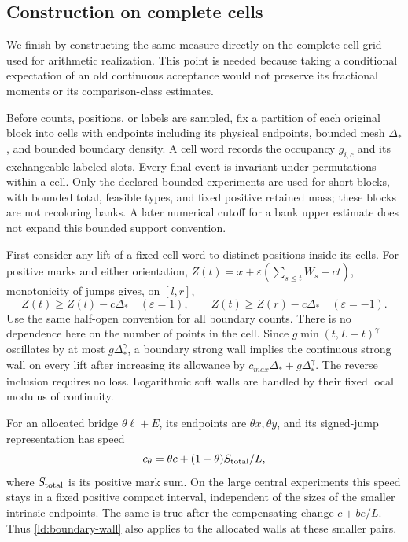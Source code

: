 \subsection{Construction on complete cells}
\label{ld:cells}

We finish by constructing the same measure directly on the complete
cell grid used for arithmetic realization.  This point is needed
because taking a conditional expectation of an old continuous
acceptance would not preserve its fractional moments or its
comparison-class estimates.

Before counts, positions, or labels are sampled, fix a partition of
each original block into cells with endpoints including its physical
endpoints, bounded mesh \(\Delta_*\), and bounded boundary density.
A cell word records the occupancy \(g_{i,c}\) and its exchangeable
labeled slots.  Every final event is invariant under permutations
within a cell.  Only the declared bounded experiments are used for
short blocks, with bounded total, feasible types, and fixed positive
retained mass; these blocks are not recoloring banks.  A later
numerical cutoff for a bank upper estimate does not expand this
bounded support convention.

First consider any lift of a fixed cell word to distinct positions
inside its cells.  For positive marks and either orientation,
\(Z(t)=x+\varepsilon(\sum_{s\le t}W_s-ct)\), monotonicity of
jumps gives, on \([l,r]\),
\begin{equation}
 Z(t)\ge Z(l)-c\Delta_*\quad(\varepsilon=1),\qquad
 Z(t)\ge Z(r)-c\Delta_*\quad(\varepsilon=-1).
 \label{ld:boundary-wall}
\end{equation}
Use the same half-open convention for all boundary counts.  There
is no dependence here on the number of points in the cell.  Since
\(g\min(t,L-t)^\gamma\) oscillates by at most
\(g\Delta_*^\gamma\), a boundary strong wall implies the
continuous strong wall on every lift after increasing its allowance
by \(c_{max}\Delta_*+g\Delta_*^\gamma\).  The reverse inclusion
requires no loss.  Logarithmic soft walls are handled by their fixed
local modulus of continuity.

For an allocated bridge \(\theta\ell+E\), its endpoints are
\(\theta x,\theta y\), and its signed-jump representation has speed
\begin{equation}
 c_\theta=\theta c+(1-\theta)S_{\rm total}/L,
 \label{ld:allocated-speed}
\end{equation}
where \(S_{\rm total}\) is its positive mark sum.  On the large
central experiments this speed stays in a fixed positive compact
interval, independent of the sizes of the smaller intrinsic endpoints.
The same is true after the compensating change \(c+be/L\).
Thus \eqref{ld:boundary-wall} also applies to the allocated walls
at these smaller pairs.

